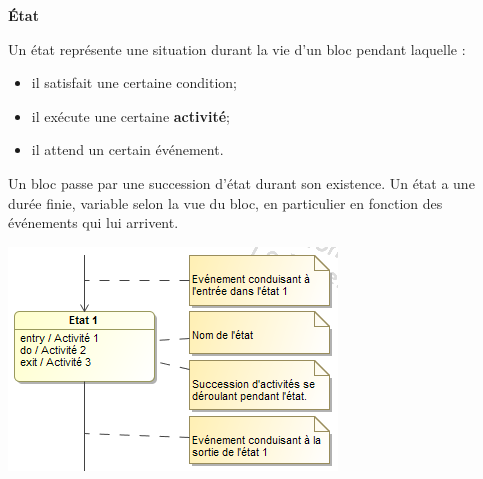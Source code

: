 \documentclass[10pt]{article}
\begin{document}
\begin{defi}
\begin{minipage}[c]{.55\linewidth}
\textbf{État}

Un état représente une situation durant la vie d'un bloc pendant laquelle :
\begin{itemize}
\item il satisfait une certaine condition;
\item il exécute une certaine \textbf{activité};
\item il attend un certain événement. 
\end{itemize}

Un bloc passe par une succession d'état durant son existence. Un état a une durée finie, variable selon la vue du bloc, en particulier en fonction des événements qui lui arrivent. 


\end{minipage} \hfill
\begin{minipage}[c]{.4\linewidth}
\begin{center}
\includegraphics[width=.95\textwidth]{images/etat}
\end{center}
\end{minipage}
\end{defi}
\end{document}
